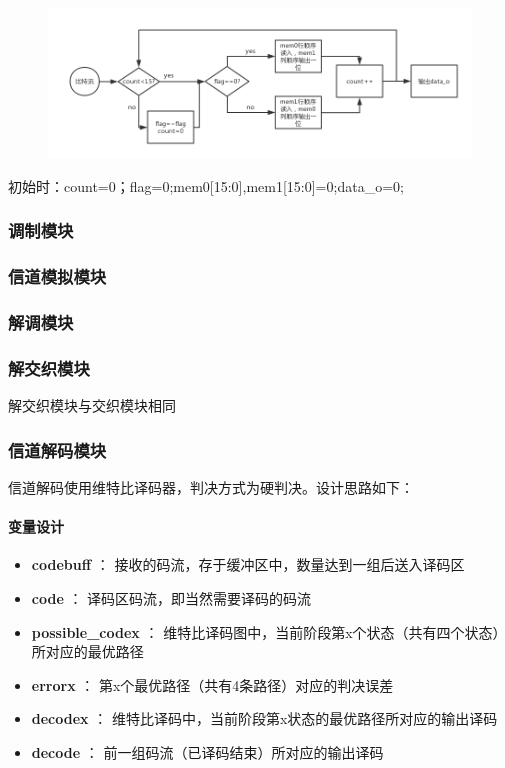 \documentclass[UTF8]{ctexart}
\begin{document}
\begin{figure}[H]
    \centering
    \includegraphics[width=\textwidth]{images//inter_pic.png}
\end{figure}

初始时：count=0；flag=0;mem0[15:0],mem1[15:0]=0;data\_o=0;

\newpage

\subsubsection{调制模块}

\subsubsection{信道模拟模块}

\subsubsection{解调模块}

\subsubsection{解交织模块}

解交织模块与交织模块相同

\subsubsection{信道解码模块}

信道解码使用维特比译码器，判决方式为硬判决。设计思路如下：

\paragraph{变量设计}

\begin{itemize}
\item \textbf{codebuff} ： 接收的码流，存于缓冲区中，数量达到一组后送入译码区
\item \textbf{code} ： 译码区码流，即当然需要译码的码流
\item \textbf{possible\_codex} ： 维特比译码图中，当前阶段第x个状态（共有四个状态）所对应的最优路径
\item \textbf{errorx} ： 第x个最优路径（共有4条路径）对应的判决误差
\item \textbf{decodex} ： 维特比译码中，当前阶段第x状态的最优路径所对应的输出译码
\item \textbf{decode} ： 前一组码流（已译码结束）所对应的输出译码
\end{itemize}
\end{document}

